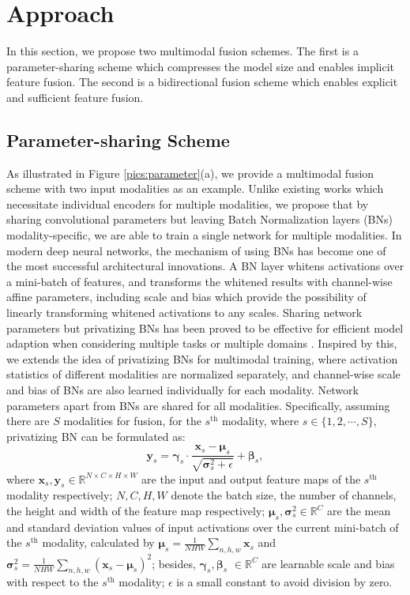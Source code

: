 \documentclass[sigconf]{acmart}
\begin{document}
\section{Approach}
In this section, we propose two multimodal fusion schemes. The first is a parameter-sharing scheme which compresses the model size and enables implicit feature fusion. The second is a bidirectional fusion scheme which enables explicit and sufficient feature fusion.
\subsection{Parameter-sharing Scheme}
\label{sec:parameter_sharing}
As illustrated in Figure \ref{pics:parameter}(a), we provide a multimodal fusion scheme with two input modalities as an example. Unlike existing works which necessitate individual encoders for multiple modalities, we propose that by sharing convolutional parameters but leaving Batch Normalization layers (BNs) \cite{DBLP:conf/icml/IoffeS15} modality-specific, we are able to train a single network for multiple modalities. 
In modern deep neural networks, the mechanism of using BNs has become one of the most successful architectural innovations. A BN layer whitens activations over a mini-batch of features, and transforms the whitened results with channel-wise affine parameters, including scale  and bias  which provide the possibility of linearly transforming whitened activations to any scales. Sharing network parameters but privatizing BNs has been proved to be effective for efficient model adaption when considering multiple tasks or multiple domains \cite{DBLP:conf/iclr/LiWS0H17,DBLP:conf/iclr/MudrakartaSZH19,DBLP:conf/iclr/YuYXYH19,wang2020rsnets}. Inspired by this, we extends the idea of privatizing BNs for multimodal training, where activation statistics of different modalities are normalized separately, and channel-wise scale and bias of BNs are also learned individually for each modality. Network parameters apart from BNs are shared for all modalities. Specifically, assuming there are $S$ modalities for fusion, for the $s^{\text{th}}$ modality, where $s\in\{1,2,\cdots,S\}$, privatizing BN can be formulated as:
\begin{equation}\label{norm}
\bm{y}_s=\bm{\gamma}_s\cdot \frac{\bm{x}_s-\bm{\mu}_s}{\sqrt{\bm{\sigma}_s^2+\epsilon}}+\bm{\beta}_s,
\end{equation}
where $\bm{x}_s,\bm{y}_s\in\mathbb{R}^{N\times C\times H \times W}$ are the input and output feature maps of the $s^{\text{th}}$ modality respectively; $N,C,H,W$ denote the batch size, the number of channels, the height and width of the feature map respectively; $\bm{\mu}_s,\bm{\sigma}_s^2\in\mathbb{R}^{C}$ are the mean and standard deviation values of input activations over the current mini-batch of the $s^{\text{th}}$ modality, calculated by $\bm{\mu}_s=\frac{1}{NHW}\sum_{n,h,w}\bm{x}_s$ and $\bm{\sigma}_s^2=\frac{1}{NHW}\sum_{n,h,w}(\bm{x}_s-\bm{\mu}_s)^2$; besides, $\bm{\gamma}_s,\bm{\beta}_s$ $\in\mathbb{R}^{C}$ are learnable scale and bias with respect to the $s^{\text{th}}$ modality; $\epsilon$ is a small constant to avoid division by zero.
\end{document}
